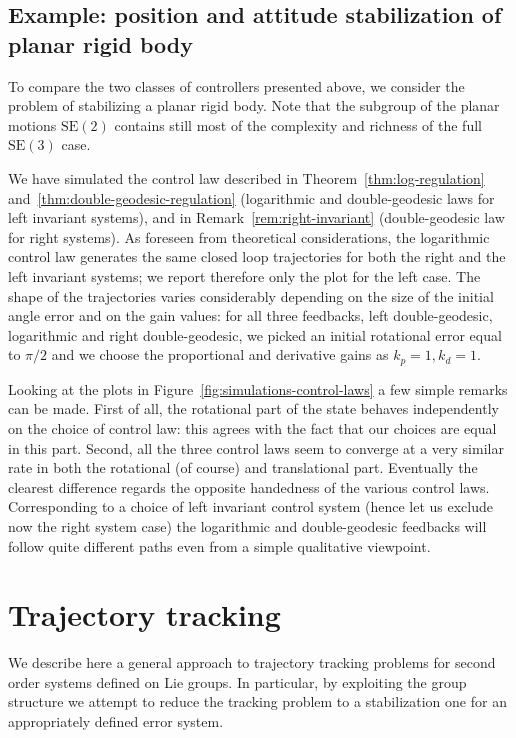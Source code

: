 \documentclass[10pt,twocolumn]{article}
\newcommand{\SE}{\mathrm{SE}}
\begin{document}
\subsection{Example: position and attitude stabilization of planar rigid body}\label{subsec:planar-stabilization}
To compare the two classes of controllers presented above, we consider the problem of stabilizing a planar rigid body. Note that the subgroup of the planar motions $\SE(2)$ contains still most of the complexity and richness of the full $\SE(3)$ case.

We have simulated the control law described in Theorem~\ref{thm:log-regulation} and~\ref{thm:double-geodesic-regulation} (logarithmic and double-geodesic laws for left invariant systems), and in Remark~\ref{rem:right-invariant} (double-geodesic law for right systems). As foreseen from theoretical considerations, the logarithmic control law generates the same closed loop trajectories for both the right and the left invariant systems; we report therefore only the plot for the left case. The shape of the trajectories varies considerably depending on the size of the initial angle error and on the gain values: for all three feedbacks, left double-geodesic, logarithmic and right double-geodesic, we picked an initial rotational error equal to $\pi/2$ and we choose the proportional and derivative gains as $k_p=1,k_d=1$.

Looking at the plots in Figure~\ref{fig:simulations-control-laws} a few simple remarks can be made. First of all, the rotational part of the state behaves independently on the choice of control law: this agrees with the fact that our choices are equal in this part. Second, all the three control laws seem to converge at a very similar rate in both the rotational (of course) and translational part. Eventually the clearest difference regards the opposite handedness of the various control laws. Corresponding to a choice of left invariant control system (hence let us exclude now the right system case) the logarithmic and double-geodesic feedbacks will follow quite different paths even from a simple qualitative viewpoint.

\section{Trajectory tracking}\label{sec:trajectory-tracking}
We describe here a general approach to trajectory tracking problems for second order systems defined on Lie groups. In particular, by exploiting the group structure we attempt to reduce the tracking problem to a stabilization one for an appropriately defined error system.
\end{document}
